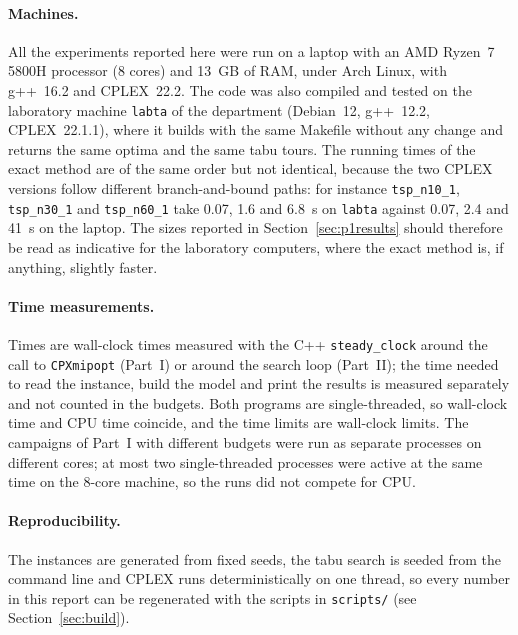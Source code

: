 \documentclass[11pt,a4paper]{article}
\begin{document}
\paragraph{Machines.}
All the experiments reported here were run on a laptop with an AMD Ryzen~7 5800H processor
(8 cores) and 13~GB of RAM, under Arch Linux, with g++~16.2 and CPLEX~22.2. The code was also
compiled and tested on the laboratory machine \texttt{labta} of the department (Debian~12, g++~12.2,
CPLEX~22.1.1), where it builds with the same Makefile without any change and returns
the same optima and the same tabu tours. The running times of the exact method are of the
same order but not identical, because the two CPLEX versions follow different
branch-and-bound paths: for instance \texttt{tsp\_n10\_1}, \texttt{tsp\_n30\_1} and
\texttt{tsp\_n60\_1} take 0.07, 1.6 and 6.8~s on \texttt{labta} against 0.07, 2.4 and
41~s on the laptop. The sizes reported in Section~\ref{sec:p1results} should therefore be
read as indicative for the laboratory computers, where the exact method is, if anything,
slightly faster.

\paragraph{Time measurements.}
Times are wall-clock times measured with the C++ \texttt{steady\_clock} around the call to
\texttt{CPXmipopt} (Part~I) or around the search loop (Part~II); the time needed to read
the instance, build the model and print the results is measured separately and not counted
in the budgets. Both programs are single-threaded, so wall-clock time and CPU time coincide,
and the time limits are wall-clock limits. The campaigns of Part~I with different budgets were
run as separate processes on different cores; at most two single-threaded processes were
active at the same time on the 8-core machine, so the runs did not compete for CPU.

\paragraph{Reproducibility.}
The instances are generated from fixed seeds, the tabu search is seeded from the command line
and CPLEX runs deterministically on one thread, so every number in this report can be
regenerated with the scripts in \texttt{scripts/} (see Section~\ref{sec:build}).

\end{document}
